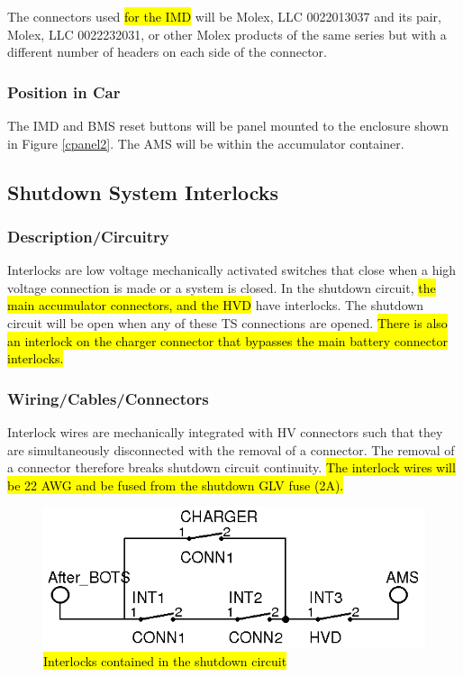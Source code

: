 \documentclass{article}
\DeclareRobustCommand{\hlr}[1]{{\sethlcolor{red}\hl{#1}}}
\begin{document}
            The connectors used \hlr{for the IMD} will be Molex, LLC 0022013037 and its pair, Molex, LLC 0022232031, or other Molex products of the same series but with a different number of headers on each side of the connector.

        \subsubsection{Position in Car}

            The IMD and BMS reset buttons will be panel mounted to the enclosure shown in Figure \ref{cpanel2}. The AMS will be within the accumulator container.

    \subsection{Shutdown System Interlocks} \label{interlocks}

        \subsubsection{Description/Circuitry}

            Interlocks are low voltage mechanically activated switches that close when a high voltage connection is made or a system is closed.  In the shutdown circuit, \hlr{the main accumulator connectors, and the HVD} have interlocks. The shutdown circuit will be open when any of these TS connections are opened. \hlr{There is also an interlock on the charger connector that bypasses the main battery connector interlocks.}

        \subsubsection{Wiring/Cables/Connectors}

            Interlock wires are mechanically integrated with HV connectors such that they are simultaneously disconnected with the removal of a connector. The removal of a connector therefore breaks shutdown circuit continuity. \hlr{The interlock wires will be 22 AWG and be fused from the shutdown GLV fuse (2A).}

            \begin{figure}[H]
                \centering
                \includegraphics{interlocks}
                \caption{\hlr{Interlocks contained in the shutdown circuit}}
                \label{interlockschem}
            \end{figure}
\end{document}
